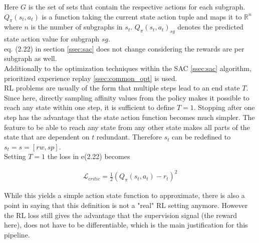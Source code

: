 Here $G$ is the set of sets that contain the respective actions for each subgraph. $Q_\pi(s_t, a_t)$ is a function taking the current state action tuple and maps it to $\mathbb{R}^n$ where $n$ is the number of subgraphs in $s_t$. $Q_\pi(s_t, a_t)_{sg}$ denotes the predicted state action value for subgraph $sg$.\\
eq. (2.22) in section \ref{ssec:sac} does not change considering the rewards are per subgraph as well.\\
Additionally to the optimization techniques within the SAC \ref{ssec:sac} algorithm, prioritized experience replay \ref{ssec:common_opt} is used.\\
RL problems are usually of the form that multiple steps lead to an end state $T$. Since here, directly sampling affinity values from the policy makes it possible to reach any state within one step, it is sufficient to define $T=1$. Stopping after one step has the advantage that the state action function becomes much simpler. The feature to be able to reach any state from any other state makes all parts of the state that are dependent on $t$ redundant. Therefore $s_t$ can be redefined to $s_t=s=[rw, sp]$.\\
Setting $T=1$ the loss in e(2.22) becomes

\begin{align}
	\mathcal{L}_{critic} = \frac{1}{2}(Q_{\pi}(s_t, a_t) - r_t) ^ 2
\end{align}

While this yields a simple action state function to approximate, there is also a point in saying that this definition is not a "real" RL setting anymore. However the RL loss still gives the advantage that the supervision signal (the reward here), does not have to be differentiable, which is the main justification for this pipeline.